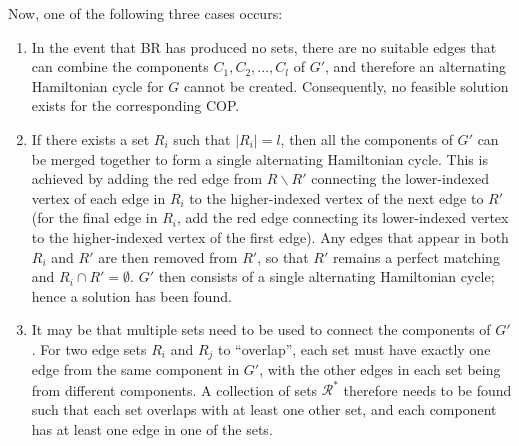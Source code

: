 \documentclass[runningheads]{llncs}
\begin{document}
Now, one of the following three cases occurs:
\begin{enumerate}
\item In the event that BR has produced no sets, there are no suitable edges that can combine the components $C_1, C_2, ..., C_l$ of $G'$, and therefore an alternating Hamiltonian cycle for $G$ cannot be created. Consequently, no feasible solution exists for the corresponding COP.

\item If there exists a set $R_i$ such that $|R_i| = l$, then all the components of $G'$ can be merged together to form a single alternating Hamiltonian cycle. This is achieved by adding the red edge from $R\backslash R'$ connecting the lower-indexed vertex of each edge in $R_i$ to the higher-indexed vertex of the next edge to $R'$ (for the final edge in $R_i$, add the red edge connecting its lower-indexed vertex to the higher-indexed vertex of the first edge). Any edges that appear in both $R_i$ and $R'$ are then removed from $R'$, so that $R'$ remains a perfect matching and $R_i \cap R' = \emptyset$. $G'$ then consists of a single alternating Hamiltonian cycle; hence a solution has been found.

\item It may be that multiple sets need to be used to connect the components of $G'$. For two edge sets $R_i$ and $R_j$ to ``overlap'', each set must have exactly one edge from the same component in $G'$, with the other edges in each set being from different components. A collection of sets $\mathcal{R}^{*}$ therefore needs to be found such that each set overlaps with at least one other set, and each component has at least one edge in one of the sets.
\end{enumerate}
\end{document}
